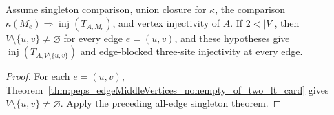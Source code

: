 \begin{theorem}%
    \label{thm:peps_edgeBlockedThreeSiteInjective_all_two_lt_card}
    \leanok
    Assume singleton comparison, union closure for $\kappa$, the comparison
    $\kappa(M_e)\Longrightarrow\operatorname{inj}(T_{A,M_e})$, and vertex
    injectivity of $A$. If $2<|V|$, then
    $V\setminus\{u,v\}\ne\varnothing$ for every edge $e=(u,v)$, and these
    hypotheses give $\operatorname{inj}(T_{A,V\setminus\{u,v\}})$ and
    edge-blocked three-site injectivity at every edge.
\end{theorem}
\begin{proof}\leanok
    For each $e=(u,v)$, Theorem~\ref{thm:peps_edgeMiddleVertices_nonempty_of_two_lt_card}
    gives $V\setminus\{u,v\}\ne\varnothing$. Apply the preceding all-edge
    singleton theorem.
\end{proof}
